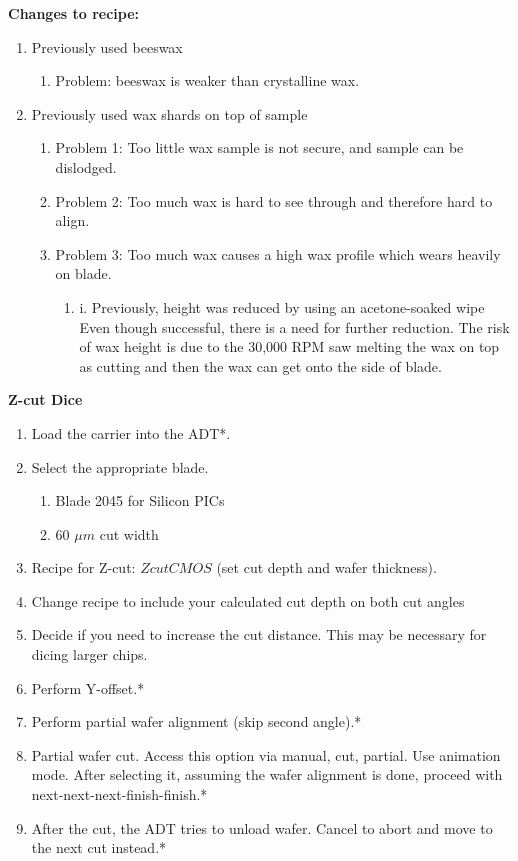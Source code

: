 \textbf{Changes to recipe:}
\begin{enumerate}
    \item Previously used beeswax
    \begin{enumerate}
        \item Problem: beeswax is weaker than crystalline wax.
    \end{enumerate}
    \item Previously used wax shards on top of sample
    \begin{enumerate}
        \item Problem 1: Too little wax sample is not secure, and sample can be dislodged.
        \item Problem 2: Too much wax is hard to see through and therefore hard to align.
        \item Problem 3: Too much wax causes a high wax profile which wears heavily on blade.
        \begin{enumerate}
            \item i.	Previously, height was reduced by using an acetone-soaked wipe Even though successful, there is a need for further reduction. The risk of wax height is due to the 30,000 RPM saw melting the wax on top as cutting and then the wax can get onto the side of blade. 
        \end{enumerate}
    \end{enumerate}
\end{enumerate}

\textbf{Z-cut Dice}
\begin{enumerate}
    \item Load the carrier into the ADT*.
    \item Select the appropriate blade.
    \begin{enumerate}
        \item Blade 2045 for Silicon PICs
        \item 60 $\mu m$ cut width
    \end{enumerate}
    \item Recipe for Z-cut: $ZcutCMOS$ (set cut depth and wafer thickness).
    \item Change recipe to include your calculated cut depth on both cut angles
    \item Decide if you need to increase the cut distance. This may be necessary for dicing larger chips. 
    \item Perform Y-offset.*
    \item Perform partial wafer alignment (skip second angle).*
    \item Partial wafer cut. Access this option via manual, cut, partial. Use animation mode. After selecting it, assuming the wafer alignment is done, proceed with next-next-next-finish-finish.*
    \item After the cut, the ADT tries to unload wafer. Cancel to abort and move to the next cut instead.*
\end{enumerate}


